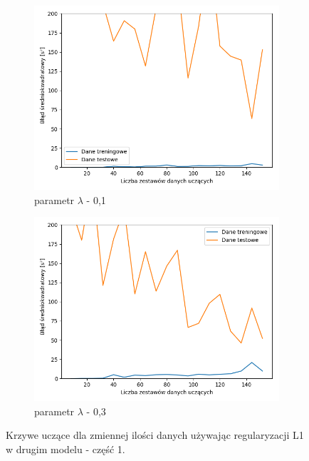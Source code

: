 \documentclass[12pt]{aghdpl}
\begin{document}
		\begin{figure}[h]
			\centering
			\begin{subfigure}{.8\linewidth}
		 		\includegraphics[width =\linewidth]{wykresy/6_regularyzacja/l1/regularyzacja_0_1_learning_curves.png}
		 		\caption{parametr $\lambda$ - 0,1}
		 	\end{subfigure}
		 	\begin{subfigure}{.8\linewidth}
		 		\includegraphics[width =\linewidth]{wykresy/6_regularyzacja/l1/regularyzacja_0_3_learning_curves.png}
		 		\caption{parametr $\lambda$ - 0,3}
		 	\end{subfigure}
		 	
		 	\caption{Krzywe uczące dla zmiennej ilości danych używając regularyzacji L1 w drugim modelu - część 1.}
			\label{fig: drugi_model_przy_regularyzacji_l1_learning_curves_1}
		\end{figure}
		
\end{document}
